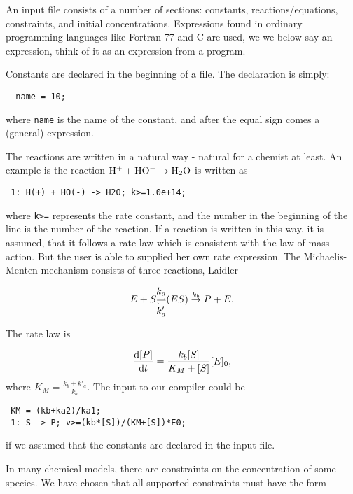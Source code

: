 An input file consists of a number of sections: constants,
reactions/equations, constraints, and initial concentrations.
Expressions found in ordinary programming languages like Fortran-77
and C are used, \ie we we below say an expression, think of it as an
expression from a program.

Constants are declared in the beginning of a file. The declaration is
simply:

\begin{verbatim}
  name = 10;
\end{verbatim}
where {\tt name} is the name of the constant, and after the equal sign
comes a (general) expression.

The reactions are written in a natural way - natural for a chemist at
least. An example is the reaction $\mbox{$\rm H^+$} + \mbox{$\rm HO^-$}
\rightarrow \mbox{$\rm H_2O$}$ is written as

\begin{verbatim}
 1: H(+) + HO(-) -> H2O; k>=1.0e+14;
\end{verbatim}
where {\tt k>=} represents the rate constant, and the number in the
beginning of the line is the number of the reaction. If a reaction is
written in this way, it is assumed, that it follows a rate law which
is consistent with the law of mass
action. But the user is able to supplied her own rate expression. The
Michaelis-Menten mechanism consists of three reactions, Laidler
\cite{Laidler:ChemKin}

\begin{equation}
  E + S \raisebox{-12pt}{\shortstack{$k_a$ \\ $\rightleftharpoons$ \\
$k'_a$}} (ES) \stackrel{k_b}{\rightarrow} P+E,
\end{equation}

The rate law is

\begin{equation}
  \frac{{\rm d}[P]}{{\rm d}t} = \frac{k_b[S]}{K_M+[S]}[E]_0,
\end{equation}
where $K_M = \frac{k_b+k'_a}{k_a}$. The input to our compiler could be

\begin{verbatim}
 KM = (kb+ka2)/ka1;
 1: S -> P; v>=(kb*[S])/(KM+[S])*E0;
\end{verbatim}
if we assumed that the constants are declared in the input file.

In many chemical models, there are constraints on the concentration of
some species. We have chosen that all supported constraints must have
the form

